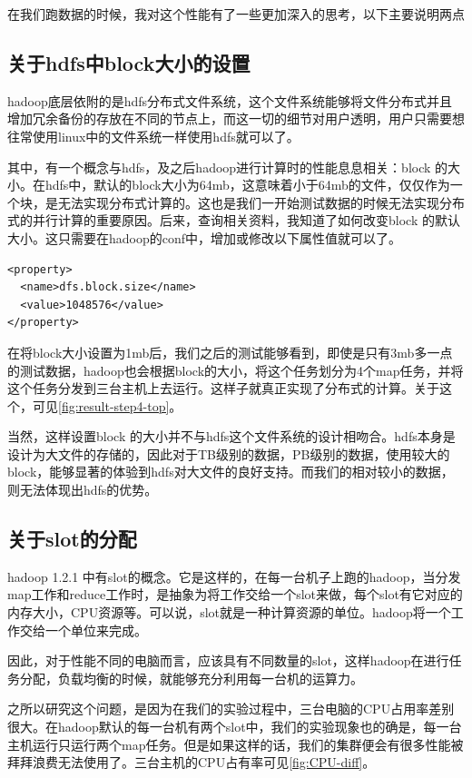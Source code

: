 \documentclass[forprint]{myreport}
\begin{document}
在我们跑数据的时候，我对这个性能有了一些更加深入的思考，以下主要说明两点

\subsection{关于hdfs中block大小的设置}

hadoop底层依附的是hdfs分布式文件系统，这个文件系统能够将文件分布式并且增加冗余备份的存放在不同的节点上，而这一切的细节对用户透明，用户只需要想往常使用linux中的文件系统一样使用hdfs就可以了。

其中，有一个概念与hdfs，及之后hadoop进行计算时的性能息息相关：block 的大小。在hdfs中，默认的block大小为64mb，这意味着小于64mb的文件，仅仅作为一个块，是无法实现分布式计算的。这也是我们一开始测试数据的时候无法实现分布式的并行计算的重要原因。后来，查询相关资料，我知道了如何改变block 的默认大小。这只需要在hadoop的conf中，增加或修改以下属性值就可以了。

\begin{lstlisting}[style = c]
<property>
  <name>dfs.block.size</name>
  <value>1048576</value>
</property>
\end{lstlisting}

在将block大小设置为1mb后，我们之后的测试能够看到，即使是只有3mb多一点的测试数据，hadoop也会根据block的大小，将这个任务划分为4个map任务，并将这个任务分发到三台主机上去运行。这样子就真正实现了分布式的计算。关于这个，可见\autoref{fig:result-step4-top}。

当然，这样设置block 的大小并不与hdfs这个文件系统的设计相吻合。hdfs本身是设计为大文件的存储的，因此对于TB级别的数据，PB级别的数据，使用较大的block，能够显著的体验到hdfs对大文件的良好支持。而我们的相对较小的数据，则无法体现出hdfs的优势。


\subsection{关于slot的分配}

hadoop 1.2.1 中有slot的概念。它是这样的，在每一台机子上跑的hadoop，当分发map工作和reduce工作时，是抽象为将工作交给一个slot来做，每个slot有它对应的内存大小，CPU资源等。可以说，slot就是一种计算资源的单位。hadoop将一个工作交给一个单位来完成。

因此，对于性能不同的电脑而言，应该具有不同数量的slot，这样hadoop在进行任务分配，负载均衡的时候，就能够充分利用每一台机的运算力。

之所以研究这个问题，是因为在我们的实验过程中，三台电脑的CPU占用率差别很大。在hadoop默认的每一台机有两个slot中，我们的实验现象也的确是，每一台主机运行只运行两个map任务。但是如果这样的话，我们的集群便会有很多性能被拜拜浪费无法使用了。三台主机的CPU占有率可见\autoref{fig:CPU-diff}。
\end{document}
